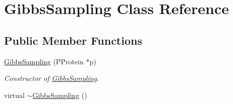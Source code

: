 \hypertarget{classGibbsSampling}{\section{Gibbs\-Sampling Class Reference}
\label{classGibbsSampling}
}
\subsection*{Public Member Functions}
\begin{DoxyCompactItemize}
\item 
\hyperlink{classGibbsSampling_aedbcd582133607373c87dccadd9f5b10}{Gibbs\-Sampling} (P\-Protein $\ast$p)
\begin{DoxyCompactList}\small\item\em Constructor of \hyperlink{classGibbsSampling}{Gibbs\-Sampling}. \end{DoxyCompactList}\item 
\hypertarget{classGibbsSampling_aa7f8351b4088af4e8d6f889219c14169}{virtual \hyperlink{classGibbsSampling_aa7f8351b4088af4e8d6f889219c14169}{$\sim$\-Gibbs\-Sampling} ()}\label{classGibbsSampling_aa7f8351b4088af4e8d6f889219c14169}


\end{DoxyCompactItemize}
